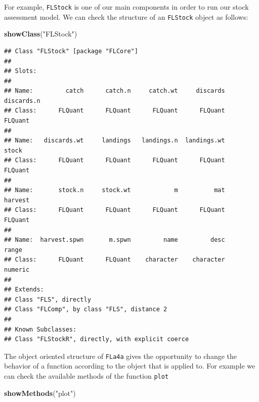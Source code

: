 \documentclass[
]{book}
\newenvironment{Shaded}{\begin{snugshade}}{\end{snugshade}}
\newcommand{\FunctionTok}[1]{\textcolor[rgb]{0.13,0.29,0.53}{\textbf{#1}}}
\newcommand{\NormalTok}[1]{#1}
\newcommand{\StringTok}[1]{\textcolor[rgb]{0.31,0.60,0.02}{#1}}
\begin{document}
For example, \texttt{FLStock} is one of our main components in order to run our stock assessment model. We can check the structure of an \texttt{FLStock} object as follows:

\begin{Shaded}
\begin{Highlighting}[]
\FunctionTok{showClass}\NormalTok{(}\StringTok{"FLStock"}\NormalTok{)}
\end{Highlighting}
\end{Shaded}

\begin{verbatim}
## Class "FLStock" [package "FLCore"]
## 
## Slots:
##                                                                        
## Name:         catch      catch.n     catch.wt     discards   discards.n
## Class:      FLQuant      FLQuant      FLQuant      FLQuant      FLQuant
##                                                                        
## Name:   discards.wt     landings   landings.n  landings.wt        stock
## Class:      FLQuant      FLQuant      FLQuant      FLQuant      FLQuant
##                                                                        
## Name:       stock.n     stock.wt            m          mat      harvest
## Class:      FLQuant      FLQuant      FLQuant      FLQuant      FLQuant
##                                                                        
## Name:  harvest.spwn       m.spwn         name         desc        range
## Class:      FLQuant      FLQuant    character    character      numeric
## 
## Extends: 
## Class "FLS", directly
## Class "FLComp", by class "FLS", distance 2
## 
## Known Subclasses: 
## Class "FLStockR", directly, with explicit coerce
\end{verbatim}

The object oriented structure of \texttt{FLa4a} gives the opportunity to change the behavior of a function according to the object that is applied to. For example we can check the available methods of the function \texttt{plot}

\begin{Shaded}
\begin{Highlighting}[]
\FunctionTok{showMethods}\NormalTok{(}\StringTok{"plot"}\NormalTok{)}
\end{Highlighting}
\end{Shaded}
\end{document}
